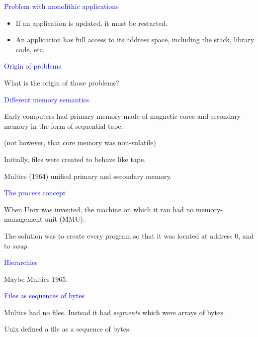 \documentclass{slides}
\newcommand{\ti}[1]{\begin{center}\Large{\textcolor{blue}{#1}}\end{center}}
\begin{document}
\begin{slide}\ti{Problem with monolithic applications}

  \begin{itemize}
  \item If an application is updated, it must be restarted.
  \item An application has full access to its address space, including
    the stack, library code, etc.
  \end{itemize}

\vfill\end{slide}
\begin{slide}\ti{Origin of problems}

What is the origin of those problems?

\vfill\end{slide}
\begin{slide}\ti{Different memory semantics}

Early computers had primary memory made of magnetic cores and
secondary memory in the form of sequential tape.

(not however, that core memory was non-volatile)

Initially, files were created to behave like tape.

Multics (1964) unified primary and secondary memory.

\vfill\end{slide}
\begin{slide}\ti{The process concept}

When Unix was invented, the machine on which it ran had no
memory-management unit (MMU).

The solution was to create every program so that it was located at
address 0, and to \emph{swap}.

\vfill\end{slide}
\begin{slide}\ti{Hierarchies}

Maybe Multics 1965.

\vfill\end{slide}
\begin{slide}\ti{Files as sequences of bytes}

Multics had no files.  Instead it had \emph{segments} which were
arrays of bytes.

Unix defined a file as a sequence of bytes.

\vfill\end{slide}
\end{document}
